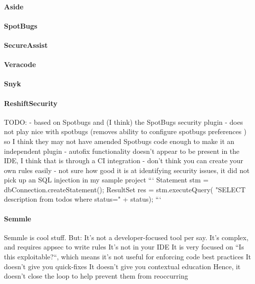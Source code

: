 \paragraph{Aside}
\paragraph{SpotBugs}
\paragraph{SecureAssist}
\paragraph{Veracode}
\paragraph{Snyk}
\paragraph{ReshiftSecurity}
TODO: %
- based on Spotbugs and (I think) the SpotBugs security plugin
- does not play nice with spotbugs (removes ability to configure spotbugs preferences ) so I think they may not have amended Spotbugs code enough to make it an independent plugin
- autofix functionality doesn't appear to be present in the IDE, I think that is through a CI integration
- don't think you can create your own rules easily
- not sure how good it is at identifying security issues, it did not pick up an SQL injection in my sample project
```
            Statement stm = dbConnection.createStatement();
            ResultSet res = stm.executeQuery(
                    "SELECT description from todos where status=" + status);
```

\paragraph{Semmle}
  Semmle is cool stuff. But:
It’s not a developer-focused tool per say. It’s complex, and requires appsec to write rules
It’s not in your IDE
It is very focused on “Is this exploitable?“, which means it’s not useful for enforcing code best practices
It doesn’t give you quick-fixes
It doesn’t give you contextual education
Hence, it doesn’t close the loop to help prevent them from reoccurring

